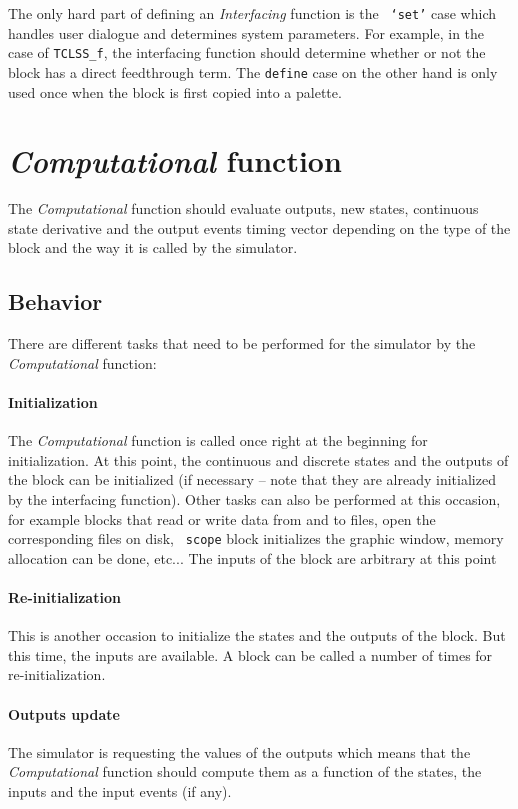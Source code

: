 \documentclass{book}
\newcommand{\computational}{{\em Computational }}
\newcommand{\interfacing}{{\em Interfacing }}
\begin{document}
The only hard part of defining an \interfacing function is the {\tt
`set'} case which handles user dialogue and determines system parameters.
For example, in the case of {\tt TCLSS\_f}, the interfacing function
should determine whether or not the block has a direct feedthrough
term. The {\tt define} case on the other hand is only
used once when the block is first copied into a palette.


\section{\computational function}
The \computational function should evaluate outputs, new states,
continuous state derivative and the output events timing vector
depending on the type of the block and the way it is called by the
simulator. 

\subsection{Behavior}
\label{tasks}
There are different tasks that need to be performed for the simulator
by the \computational function:

\paragraph{Initialization} The \computational function is called once
right at the beginning for initialization. At this point,
the continuous and discrete states and the outputs of the block  
can be initialized (if necessary -- note that they are already
initialized by the interfacing function). Other tasks can also be
performed at this occasion, for example blocks that read or
write data from and to files, open the corresponding files on disk, {\tt
scope} block initializes the graphic window, memory allocation can be done,
etc...
The inputs of the block are arbitrary at this point

\paragraph{Re-initialization} This is another occasion to initialize
the states and the outputs of the block. But this time, the inputs are
available. A block can be called a number of times for re-initialization. 

\paragraph{Outputs update} The simulator is requesting the values of
the outputs which means that the \computational function should compute
them as a function of the states, the inputs and the input events (if any).
\end{document}
